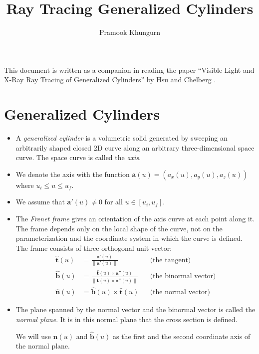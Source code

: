 \documentclass[10pt]{article}
\title{Ray Tracing Generalized Cylinders}
\author{Pramook Khungurn}
\newcommand{\ve}[1]{\bm{#1}}
\begin{document}
	\maketitle
	
	This document is written as a companion in reading the paper ``Visible Light and X-Ray Ray Tracing of Generalized Cylinders'' by Hsu and Chelberg \cite{hsu:1994}.
	
\section{Generalized Cylinders}\label{sec:generalized_cylinders} %

\begin{itemize}
  \item A \emph{generalized cylinder} is a volumetric solid generated by sweeping an arbitrarily shaped closed 2D curve along an arbitrary three-dimensional space curve. The space curve is called the \emph{axis}.
  
  \item We denote the axis with the function $\ve{a}(u) = (a_x(u), a_y(u), a_z(u))$ where $u_i \leq u \leq u_f$.
  
  \item We assume that $\ve{a}'(u) \neq 0$ for all $u \in [u_i, u_f]$.
  
  \item The \emph{Frenet frame} gives an orientation of the axis curve at each point along it. The frame depends only on the local shape of the curve, not on the parameterization and the coordinate system in which the curve is defined. The frame consists of three orthogonal unit vector:
  \begin{align*}
    \hat{\ve{t}}(u) &= \frac{\ve{a}'(u)}{\| \ve{a}'(u) \|} & & \mbox{(the tangent)}\\
    \hat{\ve{b}}(u) &= \frac{\hat{\ve{t}}(u) \times \ve{a}''(u)}{\| \hat{\ve{t}}(u) \times \ve{a}''(u) \|} & & \mbox{(the binormal vector)}\\
    \hat{\ve{n}}(u) &= \hat{\ve{b}}(u) \times \hat{\ve{t}}(u) & & \mbox{(the normal vector)}
  \end{align*}
  
  \item The plane spanned by the normal vector and the binormal vector is called the \emph{normal plane}. It is in this normal plane that the cross section is defined.
  
  We will use $\hat{\ve{n}}(u)$ and $\hat{\ve{b}}(u)$ as the first and the second coordinate axis of the normal plane.
  

\end{itemize}
\end{document}
